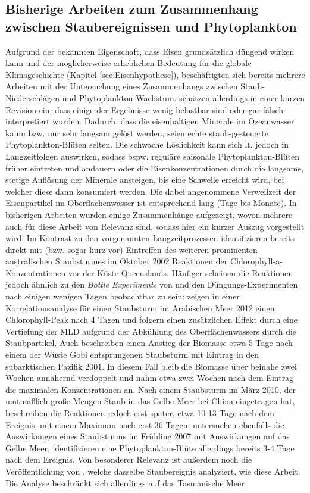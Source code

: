 \documentclass[12pt,a4paper,onecolumn,headheight=30pt]{scrartcl}
\begin{document}
\subsection{Bisherige Arbeiten zum Zusammenhang zwischen Staubereignissen und Phytoplankton}
Aufgrund der bekannten Eigenschaft, dass Eisen grundsätzlich düngend wirken kann und der möglicherweise erheblichen Bedeutung für die globale Klimageschichte (Kapitel \ref{sec:Eisenhypothese}), beschäftigten sich bereits mehrere Arbeiten mit der Untersuchung eines Zusammenhangs zwischen Staub-Niederschlägen und Phytoplankton-Wachstum. \citet{Boyd.2010} schätzen allerdings in einer kurzen Revision ein, dass einige der Ergebnisse wenig belastbar sind oder gar falsch interpretiert wurden. Dadurch, dass die eisenhaltigen Minerale im Ozeanwasser kaum bzw. nur sehr langsam gelöst werden, seien echte staub-gesteuerte Phytoplankton-Blüten selten. Die schwache Löslichkeit kann sich lt. \citet{Boyd.2010} jedoch in Langzeitfolgen auswirken, sodass bspw. reguläre saisonale Phytoplankton-Blüten früher eintreten und andauern oder die Eisenkonzentrationen durch die langsame, stetige Auflösung der Minerale ansteigen, bis eine Schwelle erreicht wird, bei welcher diese dann konsumiert werden. Die dabei angenommene Verweilzeit der Eisenpartikel im Oberflächenwasser ist entsprechend lang (Tage bis Monate). In bisherigen Arbeiten wurden einige Zusammenhänge aufgezeigt, wovon mehrere auch für diese Arbeit von Relevanz sind, sodass hier ein kurzer Auszug vorgestellt wird. Im Kontrast zu den vorgenannten Langzeitprozessen identifizieren \citet{Shaw.2008} bereits direkt mit (bzw. sogar kurz vor) Eintreffen des weiteren prominenten australischen Staubsturmes im Oktober 2002 Reaktionen der Chlorophyll-a-Konzentrationen vor der Küste Queenslands. Häufiger scheinen die Reaktionen jedoch ähnlich zu den \textit{Bottle Experiments} von \citet{Martin.1988} und den Düngungs-Experimenten \citep{Trull.2001} nach einigen wenigen Tagen beobachtbar zu sein: \citet{Bali.2019} zeigen in einer Korrelationsanalyse für einen Staubsturm im Arabischen Meer 2012 einen Chlorophyll-Peak nach 4 Tagen und folgern einen zusätzlichen Effekt durch eine Vertiefung der MLD aufgrund der Abkühlung des Oberflächenwassers durch die Staubpartikel. Auch \citet{Bishop.2002} beschreiben einen Anstieg der Biomasse etwa 5 Tage nach einem der Wüste Gobi entsprungenen Staubsturm mit Eintrag in den subarktischen Pazifik 2001. In diesem Fall bleib die Biomasse über beinahe zwei Wochen annähernd verdoppelt und nahm etwa zwei Wochen nach dem Eintrag die maximalen Konzentrationen an. Nach einem Staubsturm im März 2010, der mutmaßlich große Mengen Staub in das Gelbe Meer bei China eingetragen hat, beschreiben \citet{Tan.2014} die Reaktionen jedoch erst später, etwa 10-13 Tage nach dem Ereignis, mit einem Maximum nach erst 36 Tagen. \citet{Shi.2012} untersuchen ebenfalls die Auswirkungen eines Staubsturms im Frühling 2007 mit Auswirkungen auf das Gelbe Meer, identifizieren eine Phytoplankton-Blüte allerdings bereits 3-4 Tage nach dem Ereignis. Von besonderer Relevanz ist außerdem noch die Veröffentlichung von \citet{Gabric.2016}, welche dasselbe Staubereignis analysiert, wie  diese Arbeit. Die Analyse beschränkt sich allerdings auf das Tasmanische Meer 
\end{document}
